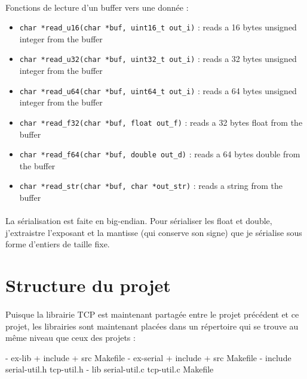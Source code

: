 \documentclass{article}
\begin{document}
    \paragraph{}
    Fonctions de lecture d'un buffer vers une donnée :
    \begin{itemize}
        \item \texttt{char *read\_u16(char *buf, uint16\_t out\_i)} : reads a 16 bytes unsigned integer from the buffer
        \item \texttt{char *read\_u32(char *buf, uint32\_t out\_i)} : reads a 32 bytes unsigned integer from the buffer
        \item \texttt{char *read\_u64(char *buf, uint64\_t out\_i)} : reads a 64 bytes unsigned integer from the buffer
        \item \texttt{char *read\_f32(char *buf, float out\_f)} : reads a 32 bytes float from the buffer
        \item \texttt{char *read\_f64(char *buf, double out\_d)} : reads a 64 bytes double from the buffer
        \item \texttt{char *read\_str(char *buf, char *out\_str)} : reads a string from the buffer
    \end{itemize}

    \paragraph{}
    La sérialisation est faite en big-endian. Pour sérialiser les float et double, j'extraistre l'exposant et la mantisse (qui conserve son signe) que je sérialise sous forme d'entiers de taille fixe.

    \section{Structure du projet}
    \paragraph{}
    Puisque la librairie TCP est maintenant partagée entre le projet précédent et ce projet, les librairies sont maintenant placées dans un répertoire qui se trouve au même niveau que ceux des projets :
    \begin{verbatimtab}
        - ex-lib
            + include
            + src
            Makefile
        - ex-serial
            + include
            + src
            Makefile
        - include
            serial-util.h
            tcp-util.h
        - lib
            serial-util.c
            tcp-util.c
        Makefile
    \end{verbatimtab}
\end{document}
